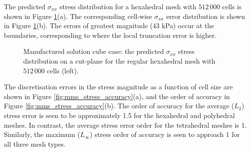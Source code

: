 \documentclass[sn-mathphys,Numbered]{sn-jnl}%
\begin{document}
The predicted $\sigma_{xx}$ stress distribution for a hexahedral mesh with $512\,000$ cells is shown in Figure \ref{fig:mms_stress}(a).
The corresponding cell-wise $\sigma_{xx}$ error distribution is shown in Figure \ref{fig:mms_stress}(b).
The errors of greatest magnitude ($43$ kPa) occur at the boundaries, corresponding to where the local truncation error is higher. %
\begin{figure}[htbp]
	\centering
	\caption{Manufactured solution cube case: the predicted $\sigma_{xx}$ stress distribution on a cut-plane for the regular hexahedral mesh with $512\,000$ cells (left).}
	\label{fig:mms_stress}
\end{figure}
The discretisation errors in the stress magnitude as a function of cell size are shown in Figure \ref{fig:mms_stress_accuracy}(a), and the order of accuracy in Figure \ref{fig:mms_stress_accuracy}(b).
The order of accuracy for the average ($L_2$) stress error is seen to be approximately 1.5 for the hexahedral and polyhedral meshes.
In contrast, the average stress error order for the tetrahedral meshes is 1.
Similarly, the maximum ($L_\infty$) stress order of accuracy is seen to approach 1 for all three mesh types.
\end{document}
